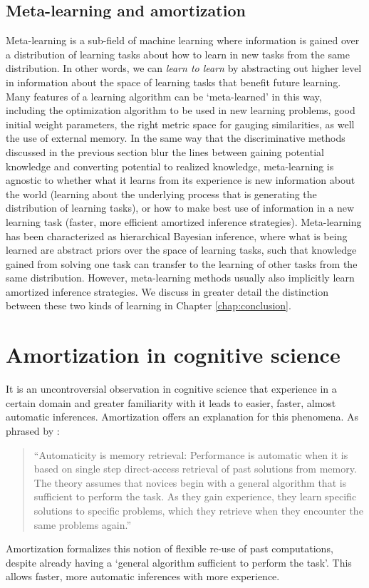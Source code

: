 \subsection{Meta-learning and amortization}
Meta-learning is a sub-field of machine learning where information is gained over a distribution of learning tasks about how to learn in new tasks from the same distribution. In other words, we can \textit{learn to learn} by abstracting out higher level in information about the space of learning tasks that benefit future learning. Many features of a learning algorithm can be `meta-learned' in this way, including the optimization algorithm to be used in new learning problems\citep{andrychowicz2016learning}, good initial weight parameters\citep{finn2017model}, the right metric space for gauging similarities\citep{vinyals2016matching}, as well the use of external memory\citep{santoro2016meta}.  In the same way that the discriminative methods discussed in the previous section blur the lines between gaining potential knowledge and converting potential to realized knowledge, meta-learning is agnostic to whether what it learns from its experience is new information about the world (learning about the underlying process that is generating the distribution of learning tasks), or how to make best use of information in a new learning task (faster, more efficient amortized inference strategies). Meta-learning has been characterized as hierarchical Bayesian inference, where what is being learned are abstract priors over the space of learning tasks, such that knowledge gained from solving one task can transfer to the learning of other tasks from the same distribution.\citep{ortega2019meta, grant2018recasting, griffiths2019doing} However, meta-learning methods usually also implicitly learn amortized inference strategies. We discuss in greater detail the distinction between these two kinds of learning in Chapter \ref{chap:conclusion}.

\section{Amortization in cognitive science}

It is an uncontroversial observation in cognitive science that experience in a certain domain and greater familiarity with it leads to easier, faster, almost automatic inferences. Amortization offers an explanation for this phenomena. As phrased by \citet{logan1988toward}:
\begin{quote}
``Automaticity is memory retrieval: Performance is automatic when it is based on single step direct-access retrieval of past solutions from memory. The theory assumes that novices begin with a general algorithm that is sufficient to perform the task. As they gain experience, they learn specific solutions to specific problems, which they retrieve when they encounter the same problems again.''
\end{quote}
Amortization formalizes this notion of flexible re-use of past computations, despite already having a `general algorithm sufficient to perform the task'. This allows faster, more automatic inferences with more experience.


